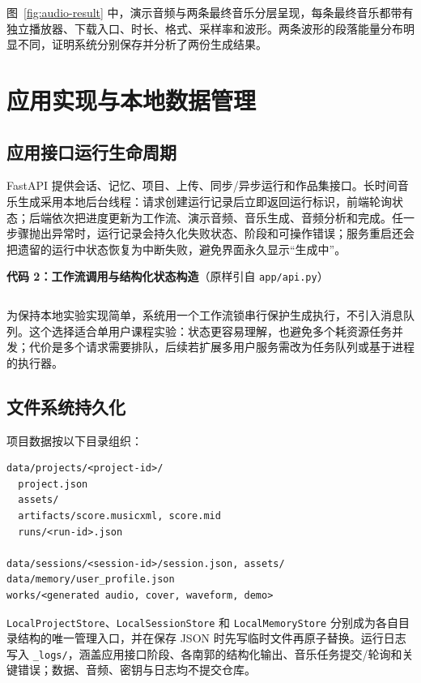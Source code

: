 \documentclass{SYSUReport}
\begin{document}
图~\ref{fig:audio-result} 中，演示音频与两条最终音乐分层呈现，每条最终音乐都带有独立播放器、下载入口、时长、格式、采样率和波形。两条波形的段落能量分布明显不同，证明系统分别保存并分析了两份生成结果。

\section{应用实现与本地数据管理}

\subsection{应用接口运行生命周期}

FastAPI 提供会话、记忆、项目、上传、同步/异步运行和作品集接口。长时间音乐生成采用本地后台线程：请求创建运行记录后立即返回运行标识，前端轮询状态；后端依次把进度更新为工作流、演示音频、音乐生成、音频分析和完成。任一步骤抛出异常时，运行记录会持久化失败状态、阶段和可操作错误；服务重启还会把遗留的运行中状态恢复为中断失败，避免界面永久显示“生成中”。

\noindent\textbf{代码 2：工作流调用与结构化状态构造}（原样引自 \verb|app/api.py|）
\inputminted[firstline=320,lastline=343]{python}{../app/api.py}

为保持本地实验实现简单，系统用一个工作流锁串行保护生成执行，不引入消息队列。这个选择适合单用户课程实验：状态更容易理解，也避免多个耗资源任务并发；代价是多个请求需要排队，后续若扩展多用户服务需改为任务队列或基于进程的执行器。

\subsection{文件系统持久化}

项目数据按以下目录组织：

\begin{verbatim}
data/projects/<project-id>/
  project.json
  assets/
  artifacts/score.musicxml, score.mid
  runs/<run-id>.json

data/sessions/<session-id>/session.json, assets/
data/memory/user_profile.json
works/<generated audio, cover, waveform, demo>
\end{verbatim}

\verb|LocalProjectStore|、\verb|LocalSessionStore| 和 \verb|LocalMemoryStore| 分别成为各自目录结构的唯一管理入口，并在保存 JSON 时先写临时文件再原子替换。运行日志写入 \verb|_logs/|，涵盖应用接口阶段、各南郭的结构化输出、音乐任务提交/轮询和关键错误；数据、音频、密钥与日志均不提交仓库。
\end{document}
